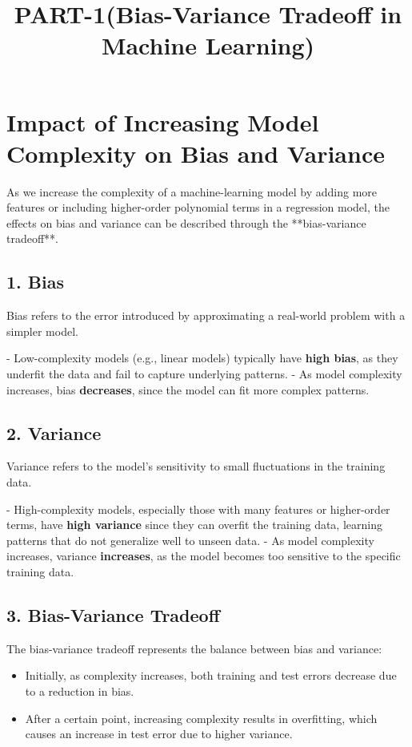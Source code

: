 \documentclass{article}
\title{PART-1(Bias-Variance Tradeoff in Machine Learning)}
\author{}
\date{}
\begin{document}
\maketitle

\section*{Impact of Increasing Model Complexity on Bias and Variance}

As we increase the complexity of a machine-learning model by adding more features or including higher-order polynomial terms in a regression model, the effects on bias and variance can be described through the **bias-variance tradeoff**.

\subsection*{1. Bias}
Bias refers to the error introduced by approximating a real-world problem with a simpler model. 

- Low-complexity models (e.g., linear models) typically have \textbf{high bias}, as they underfit the data and fail to capture underlying patterns.
- As model complexity increases, bias \textbf{decreases}, since the model can fit more complex patterns.

\subsection*{2. Variance}
Variance refers to the model's sensitivity to small fluctuations in the training data.

- High-complexity models, especially those with many features or higher-order terms, have \textbf{high variance} since they can overfit the training data, learning patterns that do not generalize well to unseen data.
- As model complexity increases, variance \textbf{increases}, as the model becomes too sensitive to the specific training data.

\subsection*{3. Bias-Variance Tradeoff}
The bias-variance tradeoff represents the balance between bias and variance:

\begin{itemize}
    \item Initially, as complexity increases, both training and test errors decrease due to a reduction in bias.
    \item After a certain point, increasing complexity results in overfitting, which causes an increase in test error due to higher variance.
\end{itemize}
\end{document}
